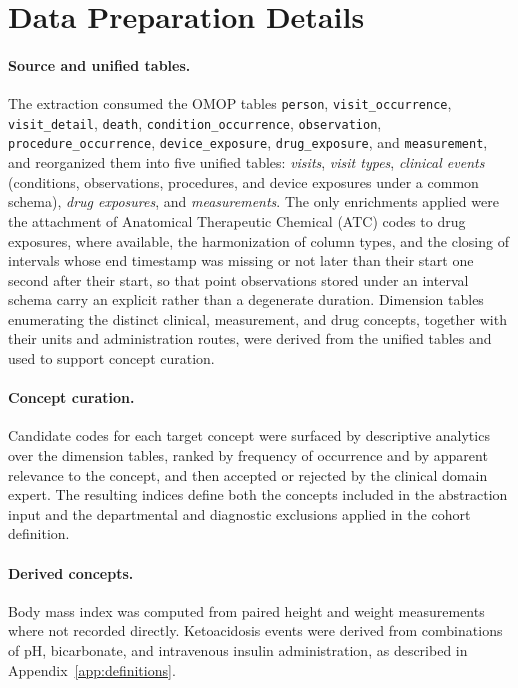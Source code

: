 \appendix

\section{Data Preparation Details}
\label{app:data-prep}

\paragraph{Source and unified tables.}
The extraction consumed the OMOP tables \texttt{person},
\texttt{visit\_occurrence}, \texttt{visit\_detail}, \texttt{death},
\texttt{condition\_occurrence}, \texttt{observation},
\texttt{procedure\_occurrence}, \texttt{device\_exposure},
\texttt{drug\_exposure}, and \texttt{measurement}, and reorganized them into
five unified tables: \emph{visits}, \emph{visit types}, \emph{clinical
events} (conditions, observations, procedures, and device exposures under a
common schema), \emph{drug exposures}, and \emph{measurements}. The only
enrichments applied were the attachment of Anatomical Therapeutic Chemical
(ATC) codes to drug exposures, where available, the harmonization of column
types, and the closing of intervals whose end timestamp was missing or not
later than their start one second after their start, so that point
observations stored under an interval schema carry an explicit rather than a
degenerate duration. Dimension tables enumerating the distinct clinical,
measurement, and drug concepts, together with their units and administration
routes, were derived from the unified tables and used to support concept
curation.

\paragraph{Concept curation.}
Candidate codes for each target concept were surfaced by descriptive
analytics over the dimension tables, ranked by frequency of occurrence and
by apparent relevance to the concept, and then accepted or rejected by the
clinical domain expert. The resulting indices define both the concepts
included in the abstraction input and the departmental and diagnostic
exclusions applied in the cohort definition.

\paragraph{Derived concepts.}
Body mass index was computed from paired height and weight measurements
where not recorded directly. Ketoacidosis events were derived from
combinations of pH, bicarbonate, and intravenous insulin administration, as
described in Appendix~\ref{app:definitions}.

